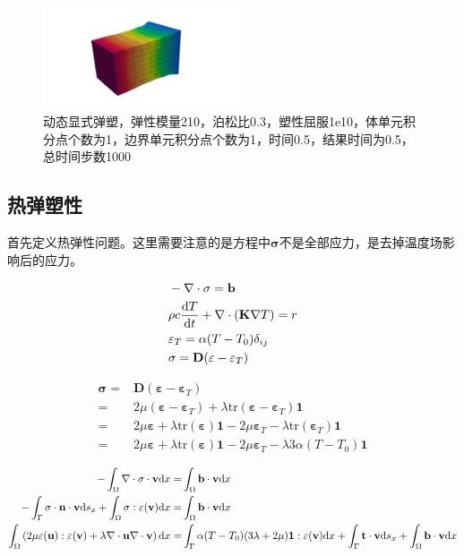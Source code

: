 \begin{figure}[!htbp]
  \centering
  \includegraphics[height=3cm]{fig/4/4.1.5/10-1.png}
  \caption{动态显式弹塑，弹性模量210，泊松比0.3，塑性屈服1e10，体单元积分点个数为1，边界单元积分点个数为1，时间0.5，结果时间为0.5，总时间步数1000}
  \label{fig:4.1.4:4}
\end{figure}


\newpage
\subsection{热弹塑性}


首先定义热弹性问题。这里需要注意的是方程中$\mathbf\sigma$不是全部应力，是去掉温度场影响后的应力。

\begin{align*}
  & -\nabla\cdot\mathbf \sigma = \mathbf b \\
  & \rho c\frac{\mathrm{d} T}{\mathrm{d} t} + \nabla\cdot \left(\mathbf K \nabla T\right)  = r\\
  & \varepsilon_T = \alpha(T-T_0)\delta_{ij} \\
  &\mathbf\sigma = \mathbf D(\mathbf\varepsilon-\mathbf\varepsilon_T)
\end{align*}

\begin{align*}
  \mathbf\sigma =& \mathbf D(\mathbf\varepsilon-\mathbf\varepsilon_T)\\
  =&2\mu(\mathbf\varepsilon-\mathbf\varepsilon_T) + \lambda\mathrm{tr}(\mathbf \varepsilon-\mathbf\varepsilon_T)\mathbf 1\\
  =&2\mu\mathbf\varepsilon + \lambda\mathrm{tr}(\mathbf \varepsilon)\mathbf 1 - 2\mu\mathbf\varepsilon_T - \lambda\mathrm{tr}(\mathbf\varepsilon_T)\mathbf 1\\
  =&2\mu\mathbf\varepsilon + \lambda\mathrm{tr}(\mathbf \varepsilon)\mathbf 1 - 2\mu\mathbf\varepsilon_T - \lambda3\alpha (T-T_0)\mathbf 1
\end{align*}

\begin{align*}
  -\int_{\Omega}\nabla\cdot\mathbf \sigma\cdot\mathbf v\mathrm{d} x =& \int_{\Omega}\mathbf b\cdot\mathbf v\mathrm{d} x \\
  -\int_{\Gamma}\mathbf\sigma\cdot\mathbf n\cdot\mathbf v\mathrm{d} s_x      +\int_{\Omega}\mathbf\sigma:\mathbf\varepsilon(\mathbf v)\mathrm{d} x =& \int_{\Omega}\mathbf b\cdot\mathbf v\mathrm{d} x\\
  \int_{\Omega}\left(2\mu\mathbf \varepsilon(\mathbf u) :\mathbf\varepsilon(\mathbf v)+\lambda\nabla\cdot\mathbf u \nabla\cdot\mathbf v\right)\mathrm{d} x =&
  \int_{\Gamma} \alpha(T-T_0)(3\lambda+2\mu)\mathbf 1:\mathbf\varepsilon(\mathbf v)\mathrm{d} x + \int_{\Gamma}\mathbf t\cdot\mathbf v\mathrm{d} s_x + \int_{\Omega}\mathbf b\cdot\mathbf v\mathrm{d} x
\end{align*}

